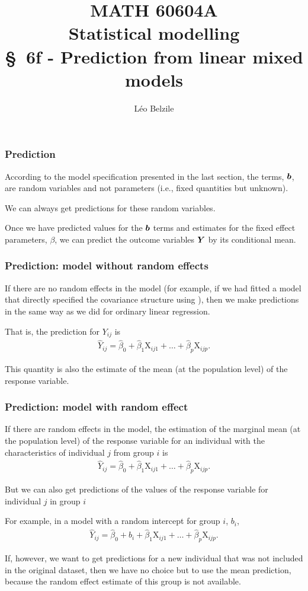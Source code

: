 \documentclass{beamer}
\title[\color{white}{MATH 60604A \S~6f - Prediction from linear mixed models}]{\texorpdfstring{MATH 60604A \\Statistical modelling \\ \S~6f - Prediction from linear mixed models}{MATH 60604A \\Statistical modelling \\ \S~6f - Prediction from linear mixed models}}
\author{Léo Belzile}
\institute{HEC Montréal\\
Department of Decision Sciences}
\date{}
\begin{document}
\frame{\titlepage}
\begin{frame}
\frametitle{Prediction}
\bi
\item According to the model specification presented in the last section, the terms, $\boldsymbol {b}$, are \alert{random variables} and not parameters (i.e., fixed quantities but unknown). 
\item We can always get \alert{predictions} for these random variables. 
\item Once we have predicted values for the $\boldsymbol {b}$ terms and estimates for the fixed effect parameters, $\beta$, we can predict the outcome variables $\boldsymbol {Y}$ by its conditional mean. 
\ei
\end{frame}


\begin{frame}
\frametitle{Prediction: model \textbf{without} random effects}
\bi
\item \alert{If there are no random effects in the model} (for example, if we had fitted a model that directly specified the covariance structure using ), then we make predictions in the same way as we did for ordinary linear regression. 
\item That is, the prediction for $Y_{ij}$ is
\begin{align*}
\hat{Y}_{ij}=\hat{\beta}_0 + \hat{\beta}_1\mathrm{X}_{ij1} + \ldots + \hat{\beta}_p\mathrm{X}_{ijp}.
\end{align*}
\item This quantity is also the estimate of the \alert{mean} (at the \alert{population level}) of the response variable.
\ei
\end{frame}

\begin{frame}
\frametitle{Prediction: model \textbf{with} random effect}
\bi
\item If there are random effects in the model, the estimation of the \alert{marginal mean} (at the \alert{population level}) of the response variable for an individual with the characteristics of individual $j$ from group $i$ is
\begin{align*}
\hat{Y}_{ij}=\hat{\beta}_0 + \hat{\beta}_1\mathrm{X}_{ij1} + \ldots + \hat{\beta}_p\mathrm{X}_{ijp}.
\end{align*}


\item But we can also get predictions of the
values of the response variable for individual $j$ in group $i$
\item For example, in a model with a random intercept for group $i$, $b_{i}$,
 \begin{align*}
\hat{Y}_{ij}=\hat{\beta}_0 +\hat{b}_{i} + \hat{\beta}_1\mathrm{X}_{ij1} + \ldots + \hat{\beta}_p\mathrm{X}_{ijp}. 
\end{align*}

\item If, however, we want to get predictions for a \alert{new}
individual that was not included in the original dataset, then we have no choice but to use the mean prediction, because the random effect estimate of this group is not available.
\ei
\end{frame}
\end{document}

